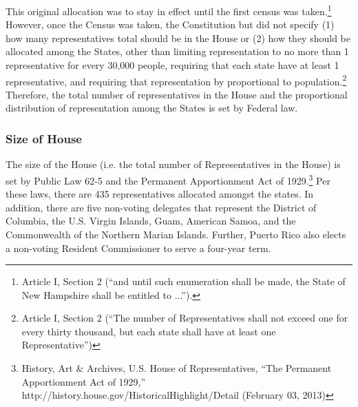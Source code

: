 This original allocation was to stay in effect until the first census was taken.\footnote{Article I, Section 2 (``and until such enumeration shall be made, the State of New Hampshire shall be entitled to ...'').}  However, once the Census was taken, the Constitution but did not specify (1) how many representatives total should be in the House or (2) how they should be allocated among the States, other than limiting representation to no more than 1 representative for every 30,000 people, requiring that each state have at least 1 representative, and requiring that representation by proportional to population.\footnote{Article I, Section 2 (``The number of Representatives shall not exceed one for every thirty thousand, but each state shall have at least one Representative'')}  Therefore, the total number of representatives in the House and the proportional distribution of representation among the States is set by Federal law.

\subsubsection{Size of House}

The size of the House (i.e. the total number of Representatives in the House) is set by Public Law 62-5 and the Permanent Apportionment Act of 1929.\footnote{History, Art \& Archives, U.S. House of Representatives, ``The Permanent Apportionment Act of 1929,'' http://history.house.gov/HistoricalHighlight/Detail (February 03, 2013)}  Per these laws, there are 435 representatives allocated amongst the states.  In addition, there are five non-voting delegates that represent the District of Columbia, the U.S. Virgin Islands, Guam, American Samoa, and the Commonwealth of the Northern Marian Islands.  Further, Puerto Rico also elects a non-voting Resident Commissioner to serve a four-year term.

